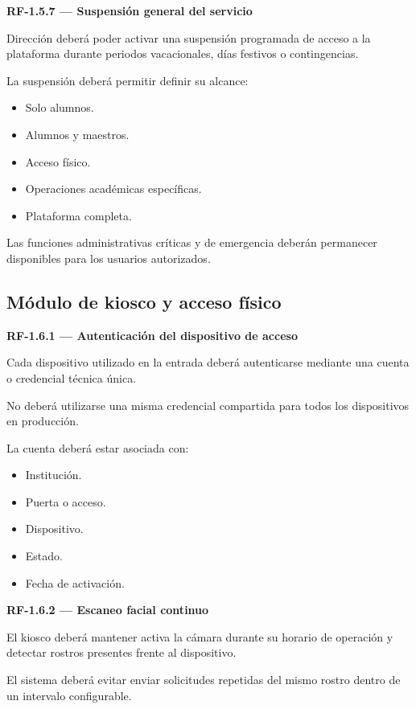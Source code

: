 \documentclass[12pt,a4paper]{article}
\newcommand{\RF}[1]{\textbf{\color{primary}RF-#1}}
\newenvironment{requisito}[1]
{
\begin{center}
\begin{minipage}{0.96\textwidth}
\colorbox{requirement}{
\begin{minipage}{0.94\textwidth}
\textbf{#1}
\end{minipage}
}
\vspace{2mm}
}
{
\end{minipage}
\end{center}
}
\begin{document}
\begin{requisito}{\RF{1.5.7} --- Suspensión general del servicio}
Dirección deberá poder activar una suspensión programada de acceso a la
plataforma durante periodos vacacionales, días festivos o contingencias.

La suspensión deberá permitir definir su alcance:

\begin{itemize}[leftmargin=*]
\item Solo alumnos.
\item Alumnos y maestros.
\item Acceso físico.
\item Operaciones académicas específicas.
\item Plataforma completa.
\end{itemize}

Las funciones administrativas críticas y de emergencia deberán permanecer
disponibles para los usuarios autorizados.
\end{requisito}

\subsection{Módulo de kiosco y acceso físico}

\begin{requisito}{\RF{1.6.1} --- Autenticación del dispositivo de acceso}
Cada dispositivo utilizado en la entrada deberá autenticarse mediante una cuenta
o credencial técnica única.

No deberá utilizarse una misma credencial compartida para todos los dispositivos
en producción.

La cuenta deberá estar asociada con:

\begin{itemize}[leftmargin=*]
\item Institución.
\item Puerta o acceso.
\item Dispositivo.
\item Estado.
\item Fecha de activación.
\end{itemize}
\end{requisito}

\begin{requisito}{\RF{1.6.2} --- Escaneo facial continuo}
El kiosco deberá mantener activa la cámara durante su horario de operación y
detectar rostros presentes frente al dispositivo.

El sistema deberá evitar enviar solicitudes repetidas del mismo rostro dentro de
un intervalo configurable.
\end{requisito}
\end{document}
